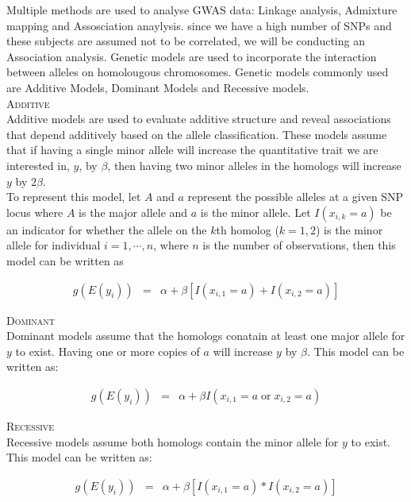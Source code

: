 \documentclass[11pt]{article}\usepackage[]{graphicx}\usepackage[]{color}
\begin{document}
Multiple methods are used to analyse GWAS data: Linkage analysis, Admixture mapping and Assosciation anaylysis. since we have a high number of SNPs and these subjects are assumed not to be correlated, we will be conducting an Association analysis. Genetic models are used to incorporate the interaction between alleles on homolougous chromosomes. Genetic models commonly used are Additive Models, Dominant Models and Recessive models. \\

\textsc{Additive}\\
Additive models are used to evaluate additive structure and reveal associations that depend additively based on the allele classification. These models assume that if having a single minor allele will increase the quantitative trait we are interested in, $y$, by $\beta$, then having two minor alleles in the homologs will increase $y$ by $2\beta$. \\
To represent this model, let $A$ and $a$ represent the possible alleles at a given SNP locus where $A$ is the major allele and $a$ is the minor allele. Let $I(x_{i,k} = a)$ be an indicator for whether the allele on the $k$th homolog ($k = 1,2$) is the minor allele for individual $i = 1, \cdots, n$, where $n$ is the number of observations, then this model can be written as 

\begin{eqnarray}
g(E(y_i)) &=& \alpha + \beta [I(x_{i,1} = a) + I(x_{i,2} = a)]
\end{eqnarray}

\textsc{Dominant}\\
Dominant models assume that the homologs conatain at least one major allele for $y$ to exist. Having one or more copies of $a$ will increase $y$ by $\beta$. This model can be written as:

\begin{eqnarray}
g(E(y_i)) &=& \alpha + \beta I(x_{i,1} = a \; \text{or} \; x_{i,2} = a)
\end{eqnarray}

\textsc{Recessive}\\
Recessive models assume both homologs contain the minor allele for $y$ to exist. This model can be written as:

\begin{eqnarray}
g(E(y_i)) &=& \alpha + \beta [I(x_{i,1} = a) * I(x_{i,2} = a)]
\end{eqnarray}

\cite[p.~61]{foulkes09}
\end{document}
